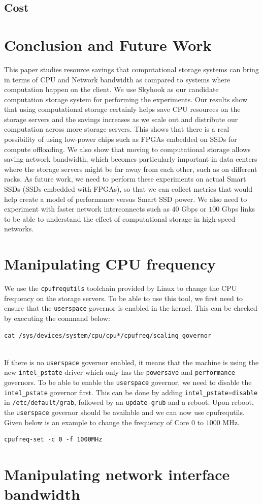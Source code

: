 \documentclass[12pt]{article}
\newcommand{\code}[1]{\colorbox{light-gray}{\texttt{#1}}}
\begin{document}
\subsection{Cost}


\section{Conclusion and Future Work}
\label{sec:future-and-concl}
This paper studies resource savings that computational storage systems can bring in terms of CPU and Network bandwidth as compared to systems where computation happen on the client. We use Skyhook as our candidate computation storage system for performing the experiments. Our results show that using computational storage certainly helps save CPU resources on the storage servers and the savings increases as we scale out and distribute our computation across more storage servers. This shows that there is a real possibility of using low-power chips such as FPGAs embedded on SSDs for compute offloading. We also show that moving to computational storage allows saving network bandwidth, which becomes particularly important in data centers where the storage servers might be far away from each other, such as on different racks. As future work, we need to perform these experiments on actual Smart SSDs (SSDs embedded with FPGAs), so that we can collect metrics that would help create a model of performance versus Smart SSD power. We also need to experiment with faster network interconnects such as $40$ Gbps or $100$ Gbps links to be able to understand the effect of computational storage in high-speed networks.




\appendix

\section{Manipulating CPU frequency}
\label{sec:app-cpu}
We use the \code{cpufrequtils} toolchain provided by Linux to change the CPU frequency on the storage servers. To be able to use this tool, we first need to ensure that the \code{userspace} governor is enabled in the kernel. This can be checked by executing the command below:

\begin{verbatim}
cat /sys/devices/system/cpu/cpu*/cpufreq/scaling_governor
\end{verbatim}
\\
If there is no \code{userspace} governor enabled, it means that the machine is using the new \code{intel\_pstate} driver which only has the \code{powersave} and \code{performance} governors. To be able to enable the \code{userspace} governor, we need to disable the \code{intel\_pstate} governor first. This can be done by adding \code{intel\_pstate=disable} in \code{/etc/default/grab}, followed by an \code{update-grub} and a reboot. Upon reboot, the \code{userspace} governor should be available and we can now use cpufrequtils. Given below is an example to change the frequency of Core $0$ to $1000$ MHz.
\begin{verbatim}
cpufreq-set -c 0 -f 1000MHz
\end{verbatim}

\section{Manipulating network interface bandwidth}
\end{document}
